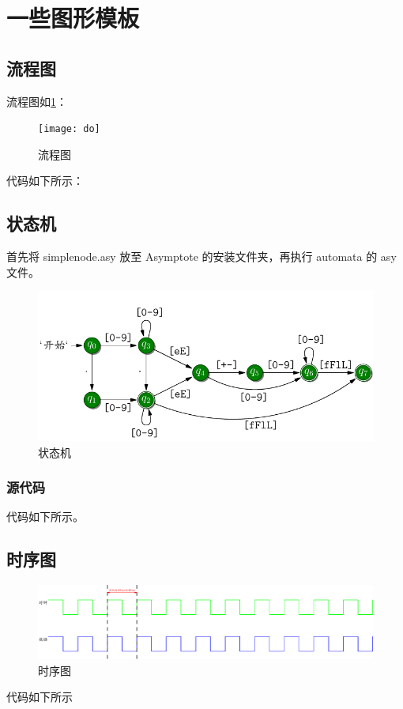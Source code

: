 \section{一些图形模板}

\subsection{流程图}
流程图如\ref{do_asy}：
\begin{figure}[H]%
\centering
\texttt{[image: do]}
\caption{流程图} \label{do_asy}
\end{figure}

代码如下所示：

  






\subsection{状态机}
首先将 simplenode.asy 放至 Asymptote 的安装文件夹，再执行 automata 的 asy 文件。
\begin{figure}[H]%
\centering
\includegraphics[width=14cm]{body/asycode/automata}
\caption{状态机} \label{automata}
\end{figure}

\subsubsection{源代码}


代码如下所示。\label{code_automata}
  

\subsection{时序图}
\begin{figure}[H]%
\centering
\includegraphics[width=14cm]{body/asycode/wave}
\caption{时序图} \label{wave}
\end{figure}
代码如下所示
\tiny
  
  \normalsize 